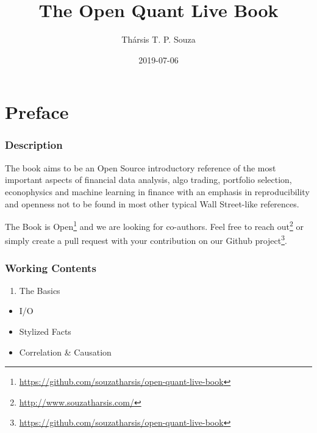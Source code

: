 \documentclass[]{book}
\title{The Open Quant Live Book}
\author{Thársis T. P. Souza}
\date{2019-07-06}
\DeclareRobustCommand{\href}[2]{#2\footnote{\url{#1}}}
\providecommand{\tightlist}{%
  \setlength{\itemsep}{0pt}\setlength{\parskip}{0pt}}
\theoremstyle{definition}
\theoremstyle{definition}
\theoremstyle{definition}
\theoremstyle{remark}
\begin{document}


\maketitle

{
\hypersetup{linkcolor=}
\setcounter{tocdepth}{2}
\tableofcontents
}
\newcommand{\independent}{\perp\!\!\!\!\perp}

\DeclarePairedDelimiter\ceil{\lceil}{\rceil}
\DeclarePairedDelimiter\floor{\lfloor}{\rfloor}

\chapter*{Preface}\label{preface}


\subsection*{Description}\label{description}


The book aims to be an Open Source introductory reference of the most
important aspects of financial data analysis, algo trading, portfolio
selection, econophysics and machine learning in finance with an emphasis
in reproducibility and openness not to be found in most other typical
Wall Street-like references.

The Book is
\href{https://github.com/souzatharsis/open-quant-live-book}{Open} and we
are looking for co-authors. Feel free to
\href{http://www.souzatharsis.com/}{reach out} or simply create a pull
request with your contribution on our
\href{https://github.com/souzatharsis/open-quant-live-book}{Github
project}.

\subsection*{Working Contents}\label{working-contents}


\begin{enumerate}
\def\labelenumi{\arabic{enumi}.}
\tightlist
\item
  The Basics
\end{enumerate}

\begin{itemize}
\tightlist
\item
  I/O
\item
  Stylized Facts
\item
  Correlation \& Causation
\end{itemize}
\end{document}

